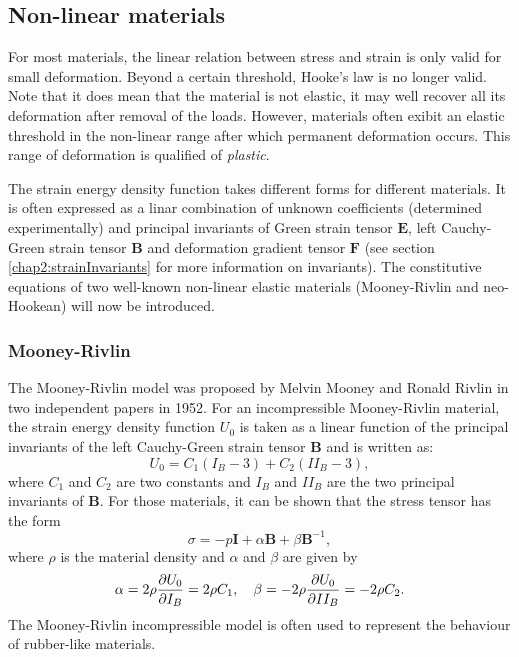 	\subsection{Non-linear materials} \label{chap2:non-linear}
For most materials, the linear relation between stress and strain is only valid for small deformation. Beyond a certain threshold, Hooke's law is no longer valid. Note that it does mean that the material is not elastic, it may well recover all its deformation after removal of the loads. However, materials often exibit an elastic threshold in the non-linear range after which permanent deformation occurs. This range of deformation is qualified of \emph{plastic}. 

The strain energy density function takes different forms for different materials. It is often expressed as a linar combination of unknown coefficients (determined experimentally) and principal invariants of Green strain tensor $\mathbf{E}$, left Cauchy-Green strain tensor $\mathbf{B}$ and deformation gradient tensor $\mathbf{F}$ (see section \ref{chap2:strainInvariants} for more information on invariants). The constitutive equations of  two well-known non-linear elastic materials (Mooney-Rivlin and neo-Hookean) will now be introduced.

	\subsubsection*{Mooney-Rivlin}
The Mooney-Rivlin model was proposed by Melvin Mooney and Ronald Rivlin in two independent papers in 1952. For an incompressible Mooney-Rivlin material, the strain energy density function $U_0$ is taken as a linear function of the principal invariants of the left Cauchy-Green strain tensor $\mathbf{B}$ and is written as:
\begin{equation}
U_0 = C_1 (I_B-3) + C_2(II_B-3),
\end{equation}
where $C_1$ and $C_2$ are two constants and $I_B$ and $II_B$ are the two principal invariants of $\mathbf{B}$. For those materials, it can be shown that the stress tensor has the form
\begin{equation}
\sigma = -p \mathbf{I} + \alpha \mathbf{B} + \beta \mathbf{B}^{-1},
\end{equation}
where $\rho$ is the material density and $\alpha$ and $\beta$ are given by
\begin{equation}
\alpha = 2 \rho \dfrac{\partial U_0}{\partial I_B} = 2 \rho C_1, \quad \beta = -2\rho \dfrac{\partial U_0}{\partial II_B} = -2\rho C_2.
\end{equation}
The Mooney-Rivlin incompressible model is often used to represent the behaviour of rubber-like materials.

